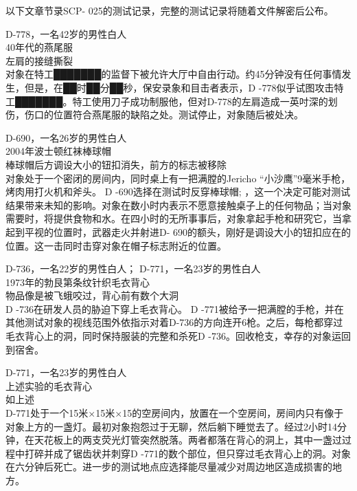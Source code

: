 以下文章节录SCP- 025的测试记录，完整的测试记录将随着文件解密后公布。

\hr

\begin{scpbox}


D-778，一名42岁的男性白人\\40年代的燕尾服\\左肩的接缝撕裂\\ 对象在特工███████的监督下被允许大厅中自由行动。约45分钟没有任何事情发生，但是，在██时██分██秒，保安录象和目击者表示，D -778似乎试图攻击特工███████。特工使用刀子成功制服他，但对D-778的左肩造成一英吋深的划伤，伤口的位置符合燕尾服的缺陷之处。测试停止，对象随后被处决。

D-690，一名26岁的男性白人\\2004年波士顿红袜棒球帽\\棒球帽后方调设大小的钮扣消失，前方的标志被移除\\对象处于一个密闭的房间内，同时桌上有一把满膛的Jericho “小沙鹰”9毫米手枪，烤肉用打火机和斧头。 D -690选择在测试时反穿棒球帽; ，这一个决定可能对测试结果带来未知的影响。对象在数小时内表示不愿意接触桌子上的任何物品；当对象需要时，将提供食物和水。在四小时的无所事事后，对象拿起手枪和研究它，当拿起到平视的位置时，武器走火并射进D- 690的额头，刚好是调设大小的钮扣应在的位置。这一击同时击穿对象在帽子标志附近的位置。

D-736，一名22岁的男性白人； D-771，一名23岁的男性白人\\1973年的勃艮第条纹针织毛衣背心\\物品像是被飞蛾咬过，背心前有数个大洞\\D -736在研发人员的胁迫下穿上毛衣背心。 D -771被给予一把满膛的手枪，并在其他测试对象的视线范围外依指示对着D-736的方向连开6枪。之后，每枪都穿过毛衣背心上的洞，同时保持服装的完整和杀死D -736。回收枪支，幸存的对象运回到宿舍。

D-771，一名23岁的男性白人\\上述实验的毛衣背心\\如上述\\D-771处于一个15米×15米×15的空房间内，放置在一个空房间，房间内只有像于对象上方的一盏灯。最初对象抱怨过于无聊，然后躺下睡觉去了。经过2小时14分钟，在天花板上的两支荧光灯管突然脱落。两者都落在背心的洞上，其中一盏过过程中打碎并成了锯齿状并刺穿D -771的数个部位，但只穿过毛衣背心上的洞。对象在六分钟后死亡。进一步的测试地点应选择能尽量减少对周边地区造成损害的地方。


\end{scpbox}
